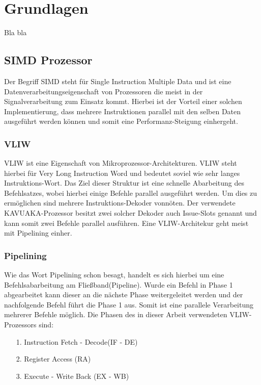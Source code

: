 \chapter{Grundlagen}
\label{chap:grundlagen}

Bla bla


\section{SIMD Prozessor}
\label{sec:VLIW}
Der Begriff SIMD steht für Single Instruction Multiple Data und ist eine Datenverarbeitungseigenschaft von Prozessoren die meist in der Signalverarbeitung zum Einsatz kommt. Hierbei ist der Vorteil einer solchen Implementierung, dass mehrere Instruktionen parallel mit den selben Daten ausgeführt werden können und somit eine Performanz-Steigung einhergeht.

\subsection{VLIW}
VLIW ist eine Eigenschaft von Mikroprozessor-Architekturen. VLIW steht hierbei für Very Long Instruction Word und bedeutet soviel wie sehr langes Instruktions-Wort. Das Ziel dieser Struktur ist eine schnelle Abarbeitung des Befehlsatzes, wobei hierbei einige Befehle parallel ausgeführt werden. Um dies zu ermöglichen sind mehrere Instruktions-Dekoder vonnöten. Der verwendete KAVUAKA-Prozessor besitzt zwei solcher Dekoder auch Issue-Slots genannt und kann somit zwei Befehle parallel ausführen. Eine VLIW-Architekur geht meist mit Pipelining einher. 
\subsection{Pipelining}
Wie das Wort Pipelining schon besagt, handelt es sich hierbei um eine Befehlsabarbeitung am Fließband(Pipeline). Wurde ein Befehl in Phase 1 abgearbeitet kann dieser an die nächste Phase weitergeleitet werden und der nachfolgende Befehl führt die Phase 1 aus. Somit ist eine parallele Verarbeitung mehrerer Befehle möglich. Die Phasen des in dieser Arbeit verwendeten VLIW-Prozessors sind:
\begin{itemize}
	\item[1.] Instruction Fetch - Decode(IF - DE) 
	\item[2.] Register Access (RA)
	\item[3.] Execute - Write Back (EX - WB)
\end{itemize}

